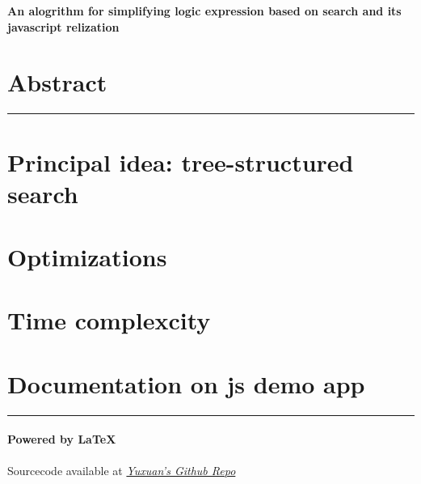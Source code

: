 


\def \SectionTitle{Session~}
\def \SubsectionTitle{Session \arabic{section} }
\def \SubsubsectionTitle{$\bullet$~Problem \arabic{subsubsection} - }


    \begin{center}
        \huge\textbf{An alogrithm for simplifying logic expression based on search and its javascript relization}

        \vspace{0.2cm}

        \normalsize{}
    \end{center}

    \section{Abstract}
    \vspace{-15pt}\noindent\rule{\textwidth}{0.1pt}\vspace{-10pt}
    \section{Principal idea: tree-structured search}

    \section{Optimizations}

    \section{Time complexcity}
    
    \section{Documentation on js demo app}

    \vfill
    \noindent\rule{\textwidth}{0.1pt}
    \vspace{-30pt}
    \paragraph*{Powered by \LaTeX}
    \hfill Sourcecode available at \textit{\href{https://github.com/zhangyx1998/Courses_FALL2019}{Yuxuan's Github Repo}}

